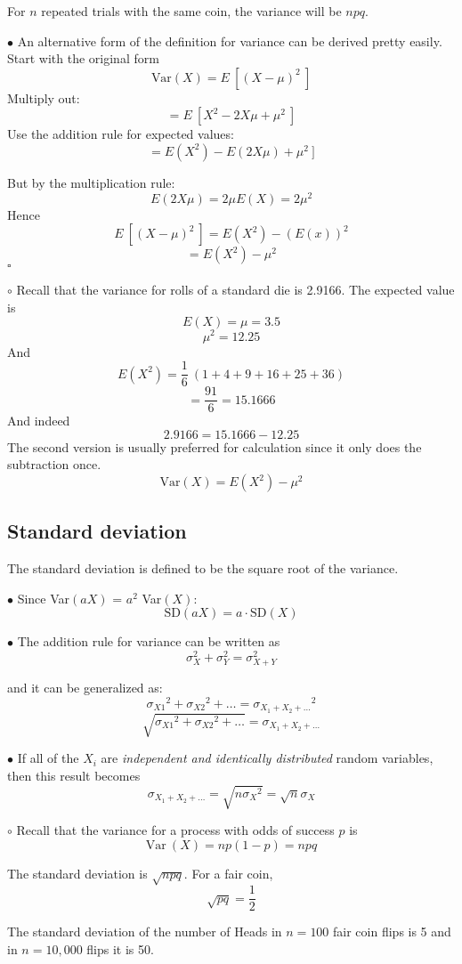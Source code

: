 \documentclass[11pt, oneside]{article}   	%
\begin{document}
For $n$ repeated trials with the same coin, the variance will be $npq$.

$\bullet$ An alternative form of the definition for variance can be derived pretty easily.  Start with the original form
\[ \text{Var}(X) = E \ [ (X - \mu)^2 \ ] \]
Multiply out:
\[ = E \ [ X^2 - 2 X \mu + \mu^2 \ ] \]
Use the addition rule for expected values:
\[ = E(X^2) - E(2 X \mu) + \mu^2 \ ] \]

But by the multiplication rule:
\[ E(2 X \mu) = 2 \mu E(X) = 2 \mu^2 \]
Hence
\[ E \ [ (X - \mu)^2 \ ] = E(X^2) - (E(x))^2 \]
\[ =  E(X^2) - \mu^2 \]
$\square$

$\circ$ Recall that the variance for rolls of a standard die is 2.9166.  The expected value is
\[ E(X) = \mu = 3.5 \]
\[ \mu^2 = 12.25 \]
And
\[ E(X^2) = \frac{1}{6} \ (1 + 4 + 9 + 16 + 25 + 36) \]
\[ = \frac{91}{6} = 15.1666 \]
And indeed
\[ 2.9166 = 15.1666 - 12.25 \]
The second version is usually preferred for calculation since it only does the subtraction once.
\[ \text{Var}(X) = E(X^2) - \mu^2 \]

\subsection*{Standard deviation}
The standard deviation is defined to be the square root of the variance.

$\bullet$ Since Var$(aX)$ = $a^2$ Var$(X)$:
\[  \text{SD}(aX) = a \cdot \text{SD}(X) \]

$\bullet$ The addition rule for variance can be written as
\[ \sigma_X^2 + \sigma_Y^2 = \sigma_{X+Y}^2\]

and it can be generalized as:
\[ {\sigma_{X1}}^2 + {\sigma_{X2}}^2 + \dots = {\sigma_{X_1 + X_2 + \dots}}^2 \]
\[ \sqrt{{\sigma_{X1}}^2 + {\sigma_{X2}}^2 + \dots} = \sigma_{X_1 + X_2 + \dots} \]

$\bullet$ If all of the $X_i$ are \emph{independent and identically distributed} random variables, then this result becomes
\[ \sigma_{X_1 + X_2 + \dots} = \sqrt{n {\sigma_{X}}^2} = \sqrt{n} \sigma_{X}  \]

$\circ$ Recall that the variance for a process with odds of success $p$ is
\[ \text{Var} \ (X) = np(1-p) = npq \]

The standard deviation is $\sqrt{npq}$.  For a fair coin, 
\[ \sqrt{pq} = \frac{1}{2} \]

The standard deviation of the number of Heads in $n = 100$ fair coin flips is 5 and in $n=10,000$ flips it is 50.
\end{document}
